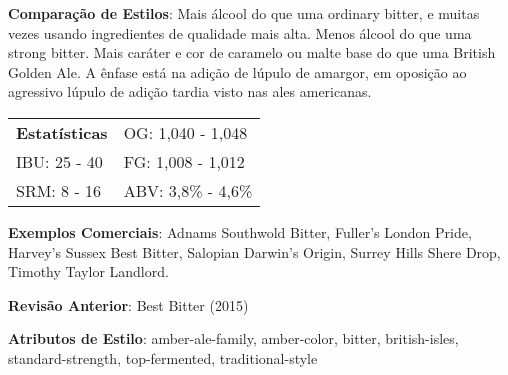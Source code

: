 \textbf{Comparação de Estilos}: Mais álcool do que uma ordinary bitter, e muitas vezes usando ingredientes de qualidade mais alta. Menos álcool do que uma strong bitter. Mais caráter e cor de caramelo ou malte base do que uma British Golden Ale. A ênfase está na adição de lúpulo de amargor, em oposição ao agressivo lúpulo de adição tardia visto nas ales americanas.

\begin{tabular}{@{}p{35mm}p{35mm}@{}}
  \textbf{Estatísticas} & OG: 1,040 - 1,048 \\
  IBU: 25 - 40  & FG: 1,008 - 1,012  \\
  SRM: 8 - 16  & ABV: 3,8\% - 4,6\%
\end{tabular}

\textbf{Exemplos Comerciais}: Adnams Southwold Bitter, Fuller's London Pride, Harvey's Sussex Best Bitter, Salopian Darwin’s Origin, Surrey Hills Shere Drop, Timothy Taylor Landlord.

\textbf{Revisão Anterior}: Best Bitter (2015)

\textbf{Atributos de Estilo}: amber-ale-family, amber-color, bitter, british-isles, standard-strength, top-fermented, traditional-style
